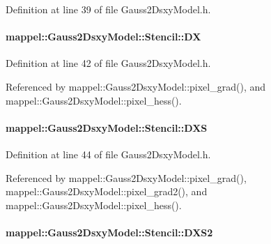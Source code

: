 Definition at line 39 of file Gauss2\+Dsxy\+Model.\+h.

\paragraph[{\texorpdfstring{DX}{DX}}]{ mappel\+::\+Gauss2\+Dsxy\+Model\+::\+Stencil\+::\+DX}\hypertarget{classmappel_1_1Gauss2DsxyModel_1_1Stencil_a2668151557e6bc843e9c1d8f50666e64}{}\label{classmappel_1_1Gauss2DsxyModel_1_1Stencil_a2668151557e6bc843e9c1d8f50666e64}


Definition at line 42 of file Gauss2\+Dsxy\+Model.\+h.



Referenced by mappel\+::\+Gauss2\+Dsxy\+Model\+::pixel\+\_\+grad(), and mappel\+::\+Gauss2\+Dsxy\+Model\+::pixel\+\_\+hess().

\paragraph[{\texorpdfstring{D\+XS}{DXS}}]{ mappel\+::\+Gauss2\+Dsxy\+Model\+::\+Stencil\+::\+D\+XS}\hypertarget{classmappel_1_1Gauss2DsxyModel_1_1Stencil_a2b06cb49a3299c8b812248f3b1dabf38}{}\label{classmappel_1_1Gauss2DsxyModel_1_1Stencil_a2b06cb49a3299c8b812248f3b1dabf38}


Definition at line 44 of file Gauss2\+Dsxy\+Model.\+h.



Referenced by mappel\+::\+Gauss2\+Dsxy\+Model\+::pixel\+\_\+grad(), mappel\+::\+Gauss2\+Dsxy\+Model\+::pixel\+\_\+grad2(), and mappel\+::\+Gauss2\+Dsxy\+Model\+::pixel\+\_\+hess().

\paragraph[{\texorpdfstring{D\+X\+S2}{DXS2}}]{ mappel\+::\+Gauss2\+Dsxy\+Model\+::\+Stencil\+::\+D\+X\+S2}\hypertarget{classmappel_1_1Gauss2DsxyModel_1_1Stencil_afe5bef8195ec8088dbb886220ac0a558}{}\label{classmappel_1_1Gauss2DsxyModel_1_1Stencil_afe5bef8195ec8088dbb886220ac0a558}


